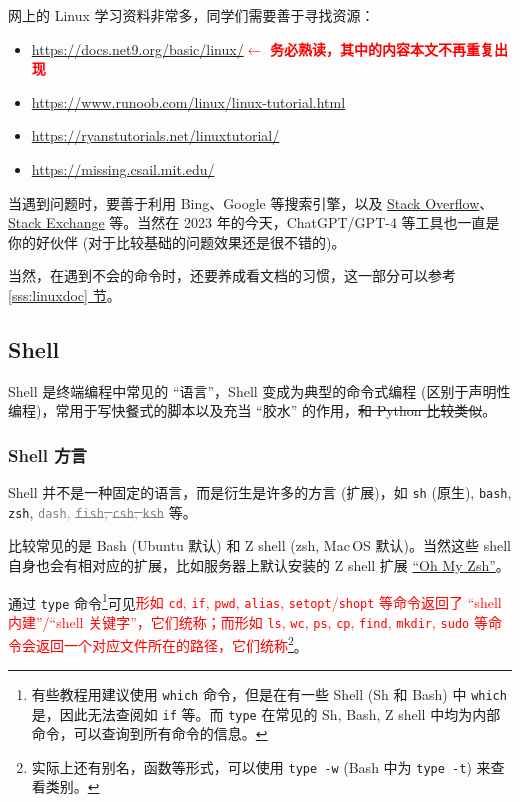 \documentclass{article}
\begin{document}
	网上的 Linux 学习资料非常多，同学们需要善于寻找资源：

	\begin{itemize}
		\itemsep0pt
		\item \url{https://docs.net9.org/basic/linux/}\quad\textcolor{red}{$\gets$ \textbf{务必熟读，其中的内容本文不再重复出现}}
		\item \url{https://www.runoob.com/linux/linux-tutorial.html}
		\item \url{https://ryanstutorials.net/linuxtutorial/}
		\item \url{https://missing.csail.mit.edu/}
	\end{itemize}

	当遇到问题时，要善于利用 Bing、Google 等搜索引擎，以及 \href{https://stackoverflow.com/}{Stack Overflow}、\href{https://stackexchange.com/}{Stack Exchange} 等。当然在 2023 年的今天，ChatGPT/GPT-4 等工具也一直是你的好伙伴 (对于比较基础的问题效果还是很不错的)。

	当然，在遇到不会的命令时，还要养成看文档的习惯，这一部分可以参考 \hyperref[sss:linuxdoc]{\ref*{sss:linuxdoc} 节}。

	\subsection{Shell}

	Shell 是终端编程中常见的 ``语言''，Shell 变成为典型的命令式编程 (区别于声明性编程)，常用于写快餐式的脚本以及充当 ``胶水'' 的作用，\sout{和 Python 比较类似}。

	\subsubsection{Shell 方言}

	Shell 并不是一种固定的语言，而是衍生是许多的方言 (扩展)，如 \texttt{sh} (原生), \texttt{bash}, \texttt{zsh}, \textcolor{gray}{\texttt{dash}, \sout{\texttt{fish}, \texttt{csh}, \texttt{ksh}}} 等。

	比较常见的是 Bash (Ubuntu 默认) 和 Z shell (zsh, Mac\,OS 默认)。当然这些 shell 自身也会有相对应的扩展，比如服务器上默认安装的 Z shell 扩展 \href{https://ohmyz.sh/}{``Oh My Zsh''}。

	通过 \texttt{type} 命令\footnote{有些教程用建议使用 \texttt{which} 命令，但是在有一些 Shell (Sh 和 Bash) 中 \texttt{which} 是，因此无法查阅如 \texttt{if} 等。而 \texttt{type} 在常见的 Sh, Bash, Z shell 中均为内部命令，可以查询到所有命令的信息。}可见\textcolor{red}{形如 \texttt{cd}, \texttt{if}, \texttt{pwd}, \texttt{alias}, \texttt{setopt}/\texttt{shopt} 等命令返回了 ``shell 内建''/``shell 关键字''，它们统称；而形如 \texttt{ls}, \texttt{wc}, \texttt{ps}, \texttt{cp}, \texttt{find}, \texttt{mkdir}, \texttt{sudo} 等命令会返回一个对应文件所在的路径，它们统称}\footnote{实际上还有别名，函数等形式，可以使用 \texttt{type -w} (Bash 中为 \texttt{type -t}) 来查看类别。}。%
\end{document}
